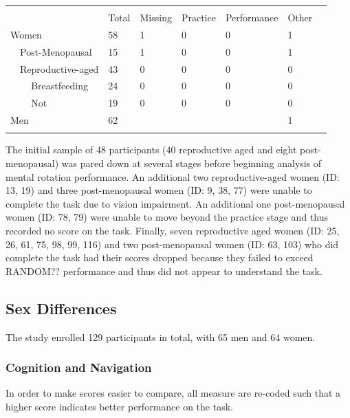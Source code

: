 \begin{table}
\begin{tabular}{lllllllll}
\hline\noalign{\smallskip}
\multicolumn{9}{c}{Pointing task}\\
& & & Total & Missing & Practice & Performance & Other \\
\multicolumn{3}{l}{Women} & 58 & 1 & 0 & 0 & 1 \\
& \multicolumn{2}{l}{Post-Menopausal} & 15 & 1 & 0 & 0 & 1 \\
& \multicolumn{2}{l}{Reproductive-aged} & 43 & 0 & 0 & 0 & 0 \\
& & Breastfeeding & 24 & 0 & 0 & 0 & 0 \\
& & Not & 19 & 0 & 0 & 0 & 0 \\
\multicolumn{3}{l}{Men} & 62 & & & & 1 \\
\noalign{\smallskip}\hline

\end{tabular}
\end{table}

The initial sample of 48 participants (40 reproductive aged and eight post-menopausal) was pared down at several stages before beginning analysis of mental rotation performance.  An additional two reproductive-aged women (ID: 13, 19) and three post-menopausal women (ID: 9, 38, 77) were unable to complete the task due to vision impairment.  An additional one post-menopausal women (ID: 78, 79) were unable to move beyond the practice stage and thus recorded no score on the task.  Finally, seven reproductive aged women (ID: 25, 26, 61, 75, 98, 99, 116) and two post-menopausal women (ID: 63, 103) who did complete the task had their scores dropped because they failed to exceed RANDOM?? performance and thus did not appear to understand the task.




	\subsection{Sex Differences}
	\label{sec:3.1}
The study enrolled 129 participants in total, with 65 men and 64 women.

		\subsubsection{Cognition and Navigation}		
		\label{sec:3.1.1}
In order to make scores easier to compare, all measure are re-coded such that a higher score indicates better performance on the task.		

